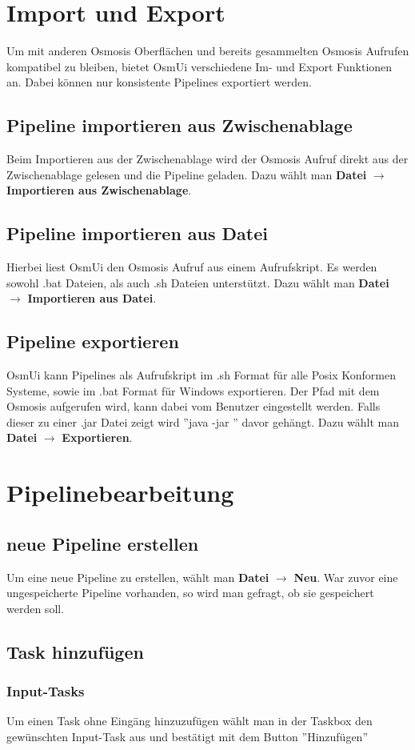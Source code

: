 \documentclass[a4paper,10pt]{scrartcl}
\begin{document}
\section{Import und Export}
Um mit anderen Osmosis Oberflächen und bereits gesammelten Osmosis Aufrufen kompatibel zu bleiben, bietet OsmUi verschiedene Im- und Export Funktionen an. Dabei können nur konsistente Pipelines exportiert werden.
\subsection{Pipeline importieren aus Zwischenablage}
Beim Importieren aus der Zwischenablage wird der Osmosis Aufruf direkt aus der
Zwischenablage gelesen und die Pipeline geladen. Dazu wählt man \textbf{Datei} $\rightarrow$ \textbf{Importieren aus Zwischenablage}.
\subsection{Pipeline importieren aus Datei}
Hierbei liest OsmUi den Osmosis Aufruf aus einem Aufrufskript. Es werden sowohl .bat
Dateien, als auch .sh Dateien unterstützt. Dazu wählt man \textbf{Datei} $\rightarrow$ \textbf{Importieren aus Datei}.
\subsection{Pipeline exportieren}
OsmUi kann Pipelines als Aufrufskript im .sh Format für alle Posix Konformen Systeme, sowie im .bat Format für Windows exportieren. Der Pfad mit dem Osmosis aufgerufen wird, kann dabei vom Benutzer eingestellt werden. Falls dieser zu einer .jar Datei zeigt wird ''java -jar ” davor gehängt. Dazu wählt man \textbf{Datei} $\rightarrow$ \textbf{Exportieren}.


\section{Pipelinebearbeitung}
\subsection{neue Pipeline erstellen}
Um eine neue Pipeline zu erstellen, wählt man \textbf{Datei} $\rightarrow$ \textbf{Neu}. War zuvor eine ungespeicherte Pipeline vorhanden, so wird man gefragt, ob sie gespeichert werden soll. 
\subsection{Task hinzufügen}
\subsubsection{Input-Tasks}
Um einen Task ohne Eingäng hinzuzufügen wählt man in der Taskbox den gewünschten Input-Task aus und bestätigt mit dem Button ''Hinzufügen''
\end{document}
